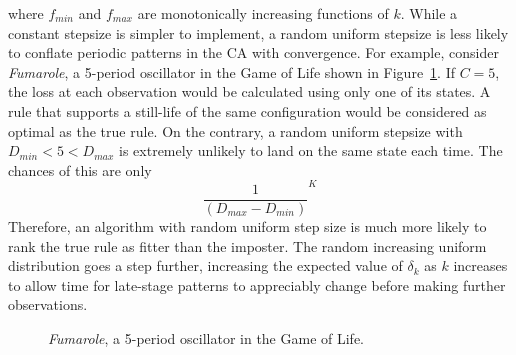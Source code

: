 where $f_{min}$ and $f_{max}$ are monotonically increasing functions of $k$. While a constant stepsize is simpler to implement, a random uniform stepsize is less likely to conflate periodic patterns in the CA with convergence. For example, consider \textit{Fumarole}, a 5-period oscillator in the Game of Life shown in Figure~\ref{fig:fumarole}. If $C=5$, the loss at each observation would be calculated using only one of its states. A rule that supports a still-life of the same configuration would be considered as optimal as the true rule. On the contrary, a random uniform stepsize with $D_{min} < 5 < D_{max}$ is extremely unlikely to land on the same state each time. The chances of this are only
\[\frac{1}{(D_{max} - D_{min})}^K\]
Therefore, an algorithm with random uniform step size is much more likely to rank the true rule as fitter than the imposter. The random increasing uniform distribution goes a step further, increasing the expected value of $\delta_k$ as $k$ increases to allow time for late-stage patterns to appreciably change before making further observations.\\

\begin{figure}[!h]
\centering
            \hfill
            \hfill
            \hfill
            \hfill
            \hfill
            \caption{\textit{Fumarole}, a 5-period oscillator in the Game of Life. \cite{fumarole}}
\label{fig:fumarole}
\end{figure}

